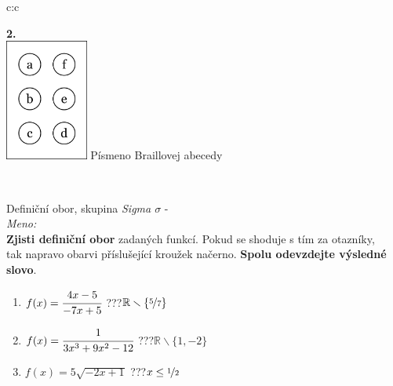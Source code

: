 \documentclass[10pt]{report}
\begin{document}
\begin{tabular}{c:c}
\begin{minipage}[c][99mm][t]{0.49\linewidth}
\begin{center}
\begin{minipage}{0.77\linewidth}
\begin{center}
\begin{varwidth}{\textwidth}
\begin{enumerate}
\end{enumerate}
\end{varwidth}
\end{center}
\end{minipage}
\begin{minipage}{0.20\linewidth}
\begin{center}
{\Huge\bfseries 2.} \\[2mm]
\includegraphics[height=40mm]{../images/braille.png}
{\small Písmeno Braillovej abecedy}
\end{center}
\end{minipage}
\end{center}
\end{minipage}
\\ \hdashline
\begin{minipage}[c][99mm][t]{0.49\linewidth}
\begin{center}
\vspace{7mm}
{\huge Definiční obor, skupina \textit{Sigma $\sigma$} -}\\[4.5mm]
\textit{Meno:}\phantom{xxxxxxxxxxxxxxxxxxxxxxxxxxxxxxxxxxxxxxxxxxxxxxxxxxxxxxxxxxxxxxxxx}\\[3.5mm]
\textbf{Zjisti definiční obor} zadaných funkcí. Pokud se shoduje s tím za otazníky,\\tak napravo obarvi příslušející kroužek načerno. \textbf{Spolu odevzdejte výsledné slovo}.\\[3mm]
\begin{minipage}{0.77\linewidth}
\begin{center}
\begin{varwidth}{\textwidth}
\begin{enumerate}
\normalsize
\item $f(x)=\cfrac{4x-5}{-7x+5}$\quad \dotfill\; ???\;\dotfill \quad $\mathbb{R}\smallsetminus\{\nicefrac{5}{7}\}$
\item $f(x)=\cfrac{1}{3x^3+9x^2-12}$\quad \dotfill\; ???\;\dotfill \quad $\mathbb{R}\smallsetminus\{1,-2\}$
\item $f(x)=5\sqrt{-2x+1}$\quad \dotfill\; ???\;\dotfill \quad $x\leq\nicefrac{1}{2}$

\end{enumerate}
\end{varwidth}
\end{center}
\end{minipage}
\end{center}
\end{minipage}
\end{tabular}
\end{document}
